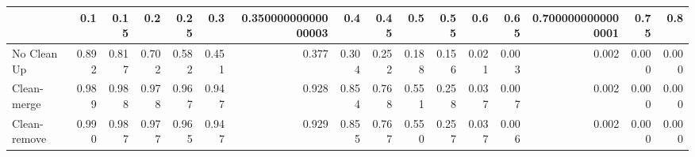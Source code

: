 \begin{tabular}{lrrrrrrrrrrrrrrr}
\toprule
{} &   0.1 &  0.15 &   0.2 &  0.25 &   0.3 & 0.35000000000000003 &   0.4 &  0.45 &   0.5 &  0.55 &   0.6 &  0.65 & 0.7000000000000001 &  0.75 &   0.8 \\
\midrule
No Clean Up  & 0.892 & 0.817 & 0.702 & 0.582 & 0.451 &               0.377 & 0.304 & 0.252 & 0.188 & 0.156 & 0.021 & 0.003 &              0.002 & 0.000 & 0.000 \\
Clean-merge  & 0.989 & 0.988 & 0.978 & 0.967 & 0.947 &               0.928 & 0.854 & 0.768 & 0.551 & 0.258 & 0.037 & 0.007 &              0.002 & 0.000 & 0.000 \\
Clean-remove & 0.990 & 0.987 & 0.977 & 0.965 & 0.947 &               0.929 & 0.855 & 0.767 & 0.550 & 0.257 & 0.037 & 0.006 &              0.002 & 0.000 & 0.000 \\
\bottomrule
\end{tabular}
